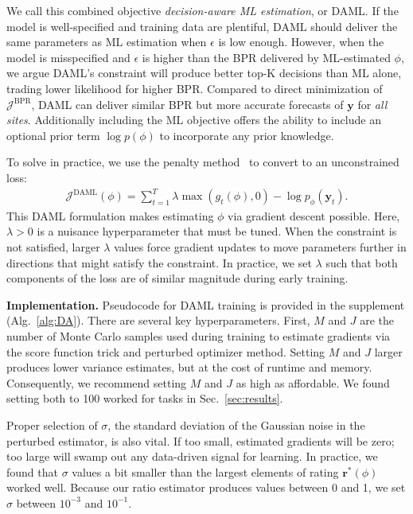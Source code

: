 We call this combined objective \emph{decision-aware ML estimation}, or DAML.
If the model is well-specified and training data are plentiful, DAML should deliver the same parameters as ML estimation when $\epsilon$ is low enough.
However, when the model is misspecified and $\epsilon$ is higher than the BPR delivered by ML-estimated $\phi$, we argue DAML's constraint will produce better top-K decisions than ML alone, trading lower likelihood for higher BPR.
Compared to direct minimization of $\mathcal{J}^{\text{BPR}}$, DAML can deliver similar BPR but more accurate forecasts of $\bm{y}$ for \emph{all sites}. Additionally  including the ML objective offers the ability to include an optional prior term $\log{p(\phi)}$ to incorporate any prior knowledge.

To solve in practice, we use the penalty method~\citep{chong_introduction_2013} to convert to an unconstrained loss:
\begin{align}
\mathcal{J}^{\text{DAML}}(\phi) {=} \textstyle \sum_{t=1}^T 
    \lambda \max( g_t(\phi), 0) - \log p_{\phi}(\bm{y}_t).
    \label{eq:hybrid_obj}
\end{align}
This DAML formulation makes estimating $\phi$ via gradient descent possible. Here, $\lambda > 0$ is a nuisance hyperparameter that must be tuned. When the constraint is not satisfied, larger $\lambda$ values force gradient updates to move parameters further in directions that might satisfy the constraint. In practice, we set $\lambda$ such that both components of the loss are of similar magnitude during early training.



\textbf{Implementation.}
Pseudocode for DAML training is provided in the supplement (Alg.~\ref{alg:DA}). There are several key hyperparameters. First,
$M$ and $J$ are the number of Monte Carlo samples used during training to estimate gradients via the score function trick and perturbed optimizer method. Setting $M$ and $J$ larger produces lower variance estimates, but at the cost of runtime and memory. Consequently, we recommend setting $M$ and $J$ as high as affordable. We found setting both to 100 worked for tasks in Sec.~\ref{sec:results}.

 Proper selection of $\sigma$, the standard deviation of the Gaussian noise in the perturbed estimator, is also vital. If too small, estimated gradients will be zero; too large will swamp out any data-driven signal for learning. In practice, we found that $\sigma$ values a bit smaller than the largest elements of rating $\bm{r}^*(\phi)$ worked well. Because our ratio estimator produces values between 0 and 1, we set $\sigma$ between $10^{-3}$ and $10^{-1}$.